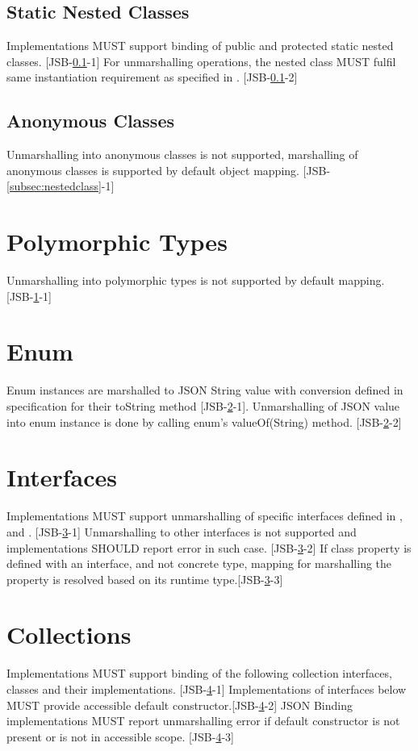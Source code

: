 \subsection{Static Nested Classes}
\label{subsec:staticnested}
Implementations MUST support binding of public and protected static nested classes. [JSB-\ref{subsec:staticnested}-1] For unmarshalling operations, the nested class MUST fulfil same instantiation requirement as specified in . [JSB-\ref{subsec:staticnested}-2]

\subsection{Anonymous Classes}
\label{subsec:anonymous}
Unmarshalling into anonymous classes is not supported, marshalling of anonymous classes is supported by default object mapping. [JSB-\ref{subsec:nestedclass}-1]

\section{Polymorphic Types}
\label{sec:polymorph}
Unmarshalling into polymorphic types is not supported by default mapping. [JSB-\ref{sec:polymorph}-1]

\section{Enum}
\label{sec:enum}
Enum instances are marshalled to JSON String value with conversion defined in specification for their toString method [JSB-\ref{sec:enum}-1]. Unmarshalling of JSON value into enum instance is done by calling enum's valueOf(String) method. [JSB-\ref{sec:enum}-2]

\section{Interfaces}
\label{sec:interfaces}
Implementations MUST support unmarshalling of specific interfaces defined in  , and . [JSB-\ref{sec:interfaces}-1] Unmarshalling to other interfaces is not supported and implementations SHOULD report error in such case. [JSB-\ref{sec:interfaces}-2] If class property is defined with an interface, and not concrete type, mapping for marshalling the property is resolved based on its runtime type.[JSB-\ref{sec:interfaces}-3]

\section{Collections}
\label{sec:collections}
Implementations MUST support binding of the following collection interfaces, classes and their implementations. [JSB-\ref{sec:collections}-1] Implementations of interfaces below MUST provide accessible default constructor.[JSB-\ref{sec:collections}-2] JSON Binding implementations MUST report unmarshalling error if default constructor is not present or is not in accessible scope. [JSB-\ref{sec:collections}-3]


